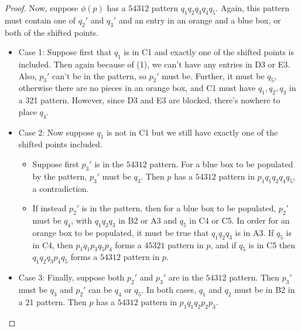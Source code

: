 \documentclass[10pt,a4paper]{amsart}
\begin{document}
\begin{proof}
    Now, suppose $\phi(p)$ has a $54312$ pattern $q_1q_2q_3q_4q_5$. Again, this pattern must contain one of $q_2'$ and $q_3'$ and an entry in an orange and a blue box, or both of the shifted points. 

    \begin{itemize}
        \item Case 1: Suppose first that $q_1$ is in C1 and exactly one of the shifted points is included. Then again because of (1), we can't have any entries in D3 or E3. Also, $p_3'$ can't be in the pattern, so $p_2'$ must be. Further, it must be $q_5$, otherwise there are no pieces in an orange box, and C1 must have $q_1,q_2,q_3$ in a 321 pattern. However, since D3 and E3 are blocked, there's nowhere to place $q_4$. 
        \item Case 2: Now suppose $q_1$ is not in C1 but we still have exactly one of the shifted points included.
        \begin{itemize}
            \item Suppose first $p_3'$ is in the $54312$ pattern. For a blue box to be populated by the pattern, $p_3'$ must be $q_3$. Then $p$ has a $54312$ pattern in $p_1q_1q_2q_4q_5$, a contradiction. 
            \item If instead $p_2'$ is in the pattern, then for a blue box to be populated, $p_2'$ must be $q_4$, with $q_1q_2q_3$ in B2 or A3 and $q_5$ in C4 or C5. In order for an orange box to be populated, it must be true that $q_1q_2q_3$ is in A3. If $q_5$ is in C4, then $p_1q_1p_3q_5p_4$ forms a $45321$ pattern in $p$, and if $q_5$ is in C5 then $q_1q_2q_3p_4q_5$ forms a $54312$ pattern in $p$. 
        \end{itemize}
        \item Case 3: Finally, suppose both $p_2'$ and $p_3'$ are in the $54312$ pattern. Then $p_3'$ must be $q_3$ and $p_2'$ can be $q_4$ or $q_5$. In both cases, $q_1$ and $q_2$ must be in B2 in a 21 pattern. Then $p$ has a $54312$ pattern in $p_1q_1q_2p_2p_3$.
    \end{itemize}

     

\end{proof}
\end{document}
